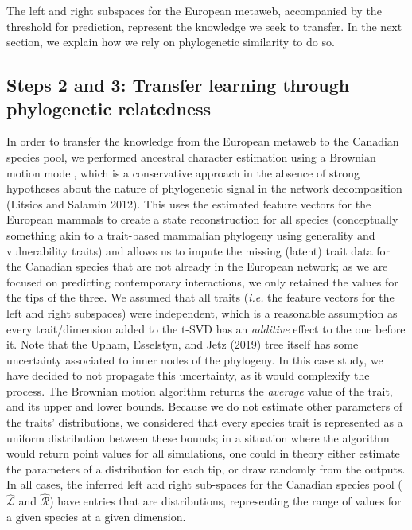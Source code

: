 \documentclass[11pt]{article}
\begin{document}
The left and right subspaces for the European metaweb, accompanied by
the threshold for prediction, represent the knowledge we seek to
transfer. In the next section, we explain how we rely on phylogenetic
similarity to do so.

\hypertarget{steps-2-and-3-transfer-learning-through-phylogenetic-relatedness}{%
\subsection{Steps 2 and 3: Transfer learning through phylogenetic
relatedness}\label{steps-2-and-3-transfer-learning-through-phylogenetic-relatedness}}

In order to transfer the knowledge from the European metaweb to the
Canadian species pool, we performed ancestral character estimation using
a Brownian motion model, which is a conservative approach in the absence
of strong hypotheses about the nature of phylogenetic signal in the
network decomposition (Litsios and Salamin 2012). This uses the
estimated feature vectors for the European mammals to create a state
reconstruction for all species (conceptually something akin to a
trait-based mammalian phylogeny using generality and vulnerability
traits) and allows us to impute the missing (latent) trait data for the
Canadian species that are not already in the European network; as we are
focused on predicting contemporary interactions, we only retained the
values for the tips of the three. We assumed that all traits
(\emph{i.e.} the feature vectors for the left and right subspaces) were
independent, which is a reasonable assumption as every trait/dimension
added to the t-SVD has an \emph{additive} effect to the one before it.
Note that the Upham, Esselstyn, and Jetz (2019) tree itself has some
uncertainty associated to inner nodes of the phylogeny. In this case
study, we have decided to not propagate this uncertainty, as it would
complexify the process. The Brownian motion algorithm returns the
\emph{average} value of the trait, and its upper and lower bounds.
Because we do not estimate other parameters of the traits'
distributions, we considered that every species trait is represented as
a uniform distribution between these bounds; in a situation where the
algorithm would return point values for all simulations, one could in
theory either estimate the parameters of a distribution for each tip, or
draw randomly from the outputs. In all cases, the inferred left and
right sub-spaces for the Canadian species pool (\(\hat{\mathcal{L}}\)
and \(\hat{\mathcal{R}}\)) have entries that are distributions,
representing the range of values for a given species at a given
dimension.
\end{document}
